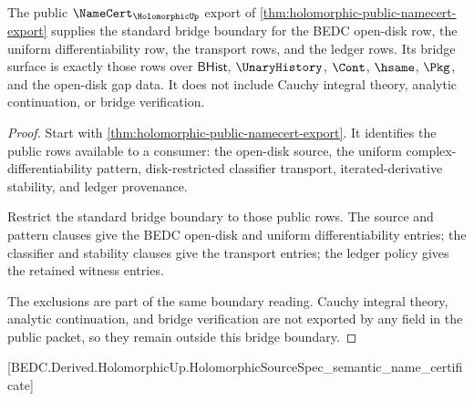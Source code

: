 \begin{theorem}
\label{thm:holomorphic-standard-bridge-boundary}
The public $\NameCert_{\HolomorphicUp}$ export of
\autoref{thm:holomorphic-public-namecert-export} supplies the standard bridge
boundary for the BEDC open-disk row, the uniform differentiability row, the
transport rows, and the ledger rows. Its bridge surface is exactly those rows
over $\mathsf{BHist}$, $\UnaryHistory$, $\Cont$, $\hsame$, $\Pkg$, and the
open-disk gap data. It does not include Cauchy integral theory, analytic
continuation, or bridge verification.
\end{theorem}
\begin{proof}
Start with \autoref{thm:holomorphic-public-namecert-export}. It identifies the
public rows available to a consumer: the open-disk source, the uniform
complex-differentiability pattern, disk-restricted classifier transport,
iterated-derivative stability, and ledger provenance.

Restrict the standard bridge boundary to those public rows. The source and
pattern clauses give the BEDC open-disk and uniform differentiability entries;
the classifier and stability clauses give the transport entries; the ledger
policy gives the retained witness entries.

The exclusions are part of the same boundary reading. Cauchy integral theory,
analytic continuation, and bridge verification are not exported by any field in
the public packet, so they remain outside this bridge boundary.
\end{proof}

[BEDC.Derived.HolomorphicUp.HolomorphicSourceSpec\_semantic\_name\_certificate]


